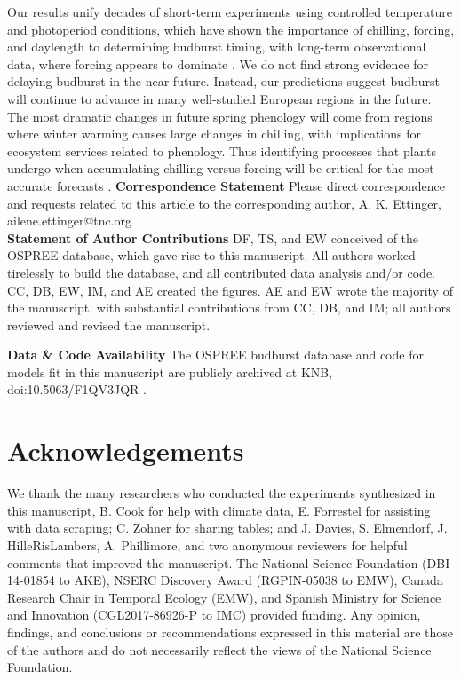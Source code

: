 \documentclass{article}
\begin{document}
 \par Our results unify decades of short-term experiments using controlled temperature and photoperiod conditions, which have shown the importance of chilling, forcing, and daylength to determining budburst timing, with long-term observational data, where forcing appears to dominate \emph{\citep[e.g.,][]{roberts2015}}. We do not find strong evidence for delaying budburst in the near future. Instead, our predictions suggest budburst will continue to advance in many well-studied European regions in the future. The most dramatic changes in future spring phenology will come from regions where winter warming causes large changes in chilling, with implications for ecosystem services related to phenology. Thus identifying processes that plants undergo when accumulating chilling versus forcing will be critical for the most accurate forecasts \emph{\citep{chuine2016,Singh:2017}}. 
\textbf{Correspondence Statement}
Please direct correspondence and requests related to this article to the corresponding author, A. K. Ettinger, ailene.ettinger@tnc.org\\
\textbf{Statement of Author Contributions} 
DF, TS, and EW conceived of the OSPREE database, which gave rise to this manuscript. All authors worked tirelessly to build the database, and all contributed data analysis and/or code. CC, DB, EW, IM, and AE created the figures. AE and EW wrote the majority of the manuscript, with substantial contributions from CC, DB, and IM; all authors reviewed and revised the manuscript. 

\textbf{Data \& Code Availability} The OSPREE budburst database and code for models fit in this manuscript are publicly archived at KNB, doi:10.5063/F1QV3JQR \citep{wolkovich2019}.

\section*{Acknowledgements}
We thank the many researchers who conducted the experiments synthesized in this manuscript, B. Cook for help with climate data, E. Forrestel for assisting with data scraping; C. Zohner for sharing tables; and J. Davies, S. Elmendorf, J. HilleRisLambers, A. Phillimore, and two anonymous reviewers for helpful comments that improved the manuscript. The National Science Foundation (DBI 14-01854 to AKE), NSERC Discovery Award (RGPIN-05038 to EMW), Canada Research Chair in Temporal Ecology (EMW), and Spanish Ministry for Science and Innovation (CGL2017-86926-P to IMC) provided funding. Any opinion, findings, and conclusions or recommendations expressed in this material are those of the authors and do not necessarily reflect the views of the National Science Foundation.
%
\newpage
\end{document}
